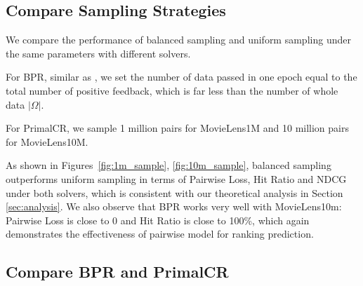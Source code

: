 \documentclass{article}
\numberwithin{equation}{section}
\newtheorem{sampling strategy}{Sampling Strategy}
\begin{document}
\subsection{Compare Sampling Strategies}

We compare the performance of balanced sampling and uniform sampling under the same parameters with different solvers. 

For \textsf{BPR}, similar as \cite{bpr}, we set the number of data passed in one epoch equal to the total number of positive feedback, which is far less than the number of whole data $|\Omega|$.

For \textsf{PrimalCR}, we sample 1 million pairs for MovieLens1M and 10 million pairs for MovieLens10M.

As shown in Figures~\ref{fig:1m_sample}, \ref{fig:10m_sample}, balanced sampling outperforms uniform sampling in terms of Pairwise Loss, Hit Ratio and NDCG under both solvers, which is consistent with our theoretical analysis in Section \ref{sec:analysis}. We also observe that BPR works very well with MovieLens10m: Pairwise Loss is close to 0 and Hit Ratio is close to 100\%, which again demonstrates the effectiveness of pairwise model for ranking prediction.




\subsection{Compare \textsf{BPR} and \textsf{PrimalCR}}
\end{document}

